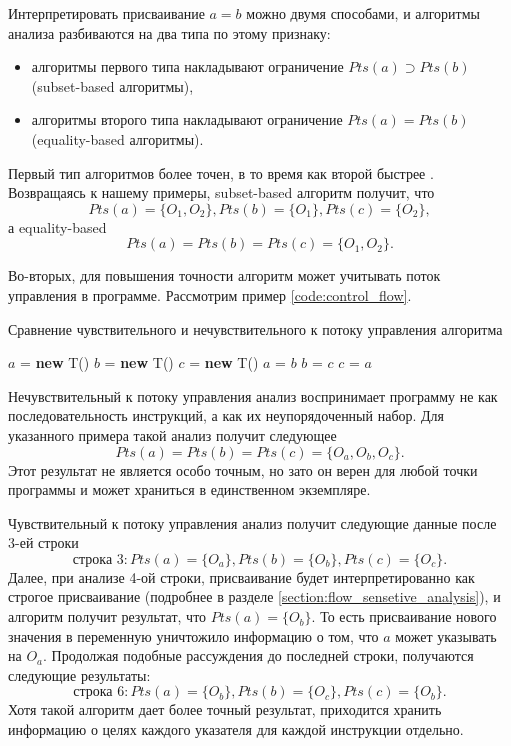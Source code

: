 \documentclass[14pt,titlepage]{extarticle}
\newcommand{\NEW}{\textbf{new }}
\newcommand{\eng}[1]{{\English#1}}
\begin{document}
      Интерпретировать присваивание $a = b$ можно двумя способами,
      и алгоритмы анализа разбиваются на два типа по этому признаку:
      \begin{itemize}
        \item алгоритмы первого типа накладывают ограничение
              $Pts(a) \supset Pts(b)$ (\eng{subset-based} алгоритмы),
        \item алгоритмы второго типа накладывают ограничение
              $Pts(a) = Pts(b)$ (\eng{equality-based} алгоритмы).
      \end{itemize}
      Первый тип алгоритмов более точен, в то время как второй быстрее
      \cite{steensgaard}. Возвращаясь к нашему примеры, \eng{subset-based}
      алгоритм получит, что
      \[Pts(a) = \{O_1, O_2\}, Pts(b) = \{O_1\}, Pts(c) = \{O_2\},\]
      а \eng{equality-based}
      \[Pts(a) = Pts(b) = Pts(c) = \{O_1, O_2\}.\]

      Во-вторых, для повышения точности алгоритм может учитывать поток управления
      в программе.
      Рассмотрим пример \ref{code:control_flow}.
      \begin{algorithm}
        \caption{Сравнение чувствительного и нечувствительного к потоку
                 управления алгоритма}
        \label{code:control_flow}
        \begin{algorithmic}[1]
          \STATE $a$ = \NEW T()
          \STATE $b$ = \NEW T()
          \STATE $c$ = \NEW T()
          \STATE $a$ = $b$
          \STATE $b$ = $c$
          \STATE $c$ = $a$
        \end{algorithmic}
      \end{algorithm}

      Нечувствительный к потоку управления анализ воспринимает программу не как
      последовательность инструкций, а как их неупорядоченный набор.
      Для указанного примера такой анализ получит следующее
      \[Pts(a) = Pts(b) = Pts(c) = \{O_a, O_b, O_c\}.\]
      Этот результат не является особо точным, но зато он верен
      для любой точки программы и может храниться в единственном экземпляре.

      Чувствительный к потоку управления анализ получит следующие данные после
      3-ей строки
      \[\textrm{строка 3}:
          Pts(a) = \{O_a\}, Pts(b) = \{O_b\}, Pts(c) = \{O_c\}.\]
      Далее, при анализе 4-ой строки, присваивание будет интерпретированно как
      строгое присваивание (подробнее в разделе
      \ref{section:flow_sensetive_analysis}), и алгоритм получит
      результат, что $Pts(a) = \{O_b\}$. То есть присваивание нового значения
      в переменную уничтожило информацию о том, что $a$ может указывать на $O_a$.
      Продолжая подобные рассуждения до последней строки, получаются следующие
      результаты:
      \[\textrm{строка 6}:
          Pts(a) = \{O_b\}, Pts(b) = \{O_c\}, Pts(c) = \{O_b\}.\]
      Хотя такой алгоритм дает более точный результат, приходится хранить
      информацию о целях каждого указателя для каждой инструкции отдельно.
\end{document}
